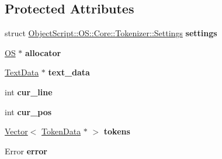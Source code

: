 \subsection*{Protected Attributes}
\begin{DoxyCompactItemize}
\item 
struct \hyperlink{struct_object_script_1_1_o_s_1_1_core_1_1_tokenizer_1_1_settings}{Object\+Script\+::\+O\+S\+::\+Core\+::\+Tokenizer\+::\+Settings} {\bfseries settings}\hypertarget{class_object_script_1_1_o_s_1_1_core_1_1_tokenizer_ad5c087b033badeb2591fceba96b8c0c3}{}\label{class_object_script_1_1_o_s_1_1_core_1_1_tokenizer_ad5c087b033badeb2591fceba96b8c0c3}

\item 
\hyperlink{class_object_script_1_1_o_s}{OS} $\ast$ {\bfseries allocator}\hypertarget{class_object_script_1_1_o_s_1_1_core_1_1_tokenizer_a2e92c65ab55068bb04ee5b41186d0103}{}\label{class_object_script_1_1_o_s_1_1_core_1_1_tokenizer_a2e92c65ab55068bb04ee5b41186d0103}

\item 
\hyperlink{class_object_script_1_1_o_s_1_1_core_1_1_tokenizer_1_1_text_data}{Text\+Data} $\ast$ {\bfseries text\+\_\+data}\hypertarget{class_object_script_1_1_o_s_1_1_core_1_1_tokenizer_a50a2e2c02041ebfc0cd8086297491bb1}{}\label{class_object_script_1_1_o_s_1_1_core_1_1_tokenizer_a50a2e2c02041ebfc0cd8086297491bb1}

\item 
int {\bfseries cur\+\_\+line}\hypertarget{class_object_script_1_1_o_s_1_1_core_1_1_tokenizer_ae2cb3d6c8a9f2ee6f8e3af683879ed2e}{}\label{class_object_script_1_1_o_s_1_1_core_1_1_tokenizer_ae2cb3d6c8a9f2ee6f8e3af683879ed2e}

\item 
int {\bfseries cur\+\_\+pos}\hypertarget{class_object_script_1_1_o_s_1_1_core_1_1_tokenizer_a133d8e990b32dcb3040620641674857d}{}\label{class_object_script_1_1_o_s_1_1_core_1_1_tokenizer_a133d8e990b32dcb3040620641674857d}

\item 
\hyperlink{struct_object_script_1_1_o_s_1_1_vector}{Vector}$<$ \hyperlink{class_object_script_1_1_o_s_1_1_core_1_1_tokenizer_1_1_token_data}{Token\+Data} $\ast$ $>$ {\bfseries tokens}\hypertarget{class_object_script_1_1_o_s_1_1_core_1_1_tokenizer_aff718b100295e7763c2753c44899bb13}{}\label{class_object_script_1_1_o_s_1_1_core_1_1_tokenizer_aff718b100295e7763c2753c44899bb13}

\item 
Error {\bfseries error}\hypertarget{class_object_script_1_1_o_s_1_1_core_1_1_tokenizer_a5ecd657c4b9277214768d3546adcb28c}{}\label{class_object_script_1_1_o_s_1_1_core_1_1_tokenizer_a5ecd657c4b9277214768d3546adcb28c}

\end{DoxyCompactItemize}
